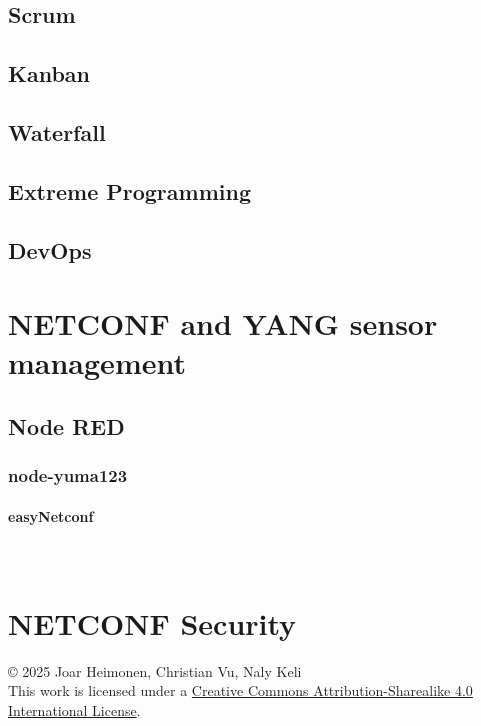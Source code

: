 \documentclass[12pt]{article}
\newcommand{\subsubsubsection}[1]{\paragraph{#1}\mbox{}\\}
\newcommand{\license}{
    \vspace{1em}
    \noindent\small{© 2025 Joar Heimonen,  Christian Vu, Naly Keli\\
    This work is licensed under a \href{https://creativecommons.org/licenses/by-sa/4.0/}{Creative Commons Attribution-Sharealike 4.0 International License}.}
}
\begin{document}
\subsection{Scrum}


\subsection{Kanban}
\subsection{Waterfall}
\subsection{Extreme Programming}
\subsection{DevOps}


\section{NETCONF and YANG sensor management}

\subsection{Node RED}
\subsubsection{node-yuma123}
\subsubsubsection{easyNetconf}

\section{NETCONF Security}

\pagebreak
{}
\printbibliography
\license
\end{document}
